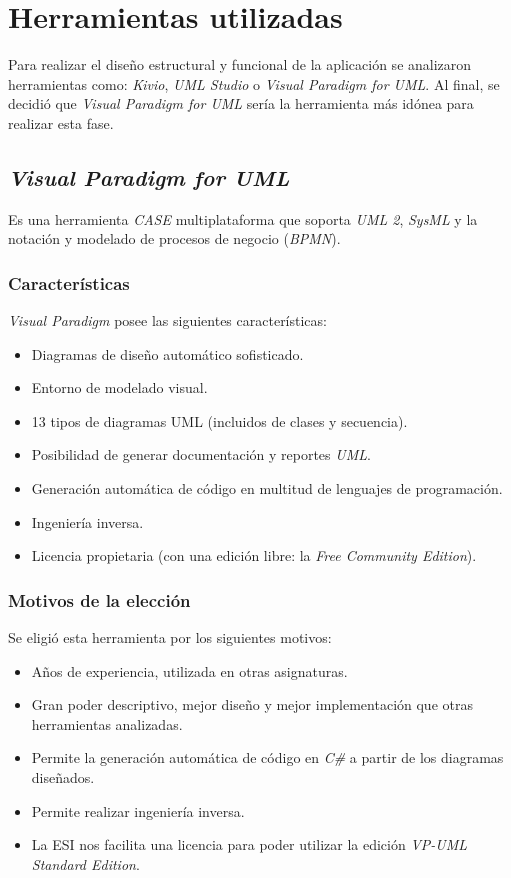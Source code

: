 \section{Herramientas utilizadas}
Para realizar el diseño estructural y funcional de la aplicación se analizaron
herramientas como: \emph{Kivio}, \emph{UML Studio} o \emph{Visual Paradigm for
UML}. Al final, se decidió que \emph{Visual Paradigm for UML} sería la
herramienta más idónea para realizar esta fase.

\subsection{\emph{Visual Paradigm for UML}}
Es una herramienta \emph{CASE} multiplataforma que soporta \emph{UML 2},
\emph{SysML} y la notación y modelado de procesos de negocio (\emph{BPMN}).

\subsubsection{Características}
\emph{Visual Paradigm} posee las siguientes características:
\begin{itemize}
\item Diagramas de diseño automático sofisticado. 
\item Entorno de modelado visual. 
\item 13 tipos de diagramas UML (incluidos de clases y secuencia). 
\item Posibilidad de generar documentación y reportes \emph{UML}.
\item Generación automática de código en multitud de lenguajes de programación.
\item Ingeniería inversa.
\item Licencia propietaria (con una edición libre: la \emph{Free Community
Edition}).
\end{itemize}

\subsubsection{Motivos de la elección}
Se eligió esta herramienta por los siguientes motivos:
\begin{itemize}
\item Años de experiencia, utilizada en otras asignaturas. 
\item Gran poder descriptivo, mejor diseño y mejor implementación que otras 
herramientas analizadas. 
\item Permite la generación automática de código en \emph{C\#} a partir de los
diagramas diseñados.
\item Permite realizar ingeniería inversa. 
\item La ESI nos facilita una licencia para poder utilizar la edición
\emph{VP-UML Standard Edition}.
\end{itemize}

